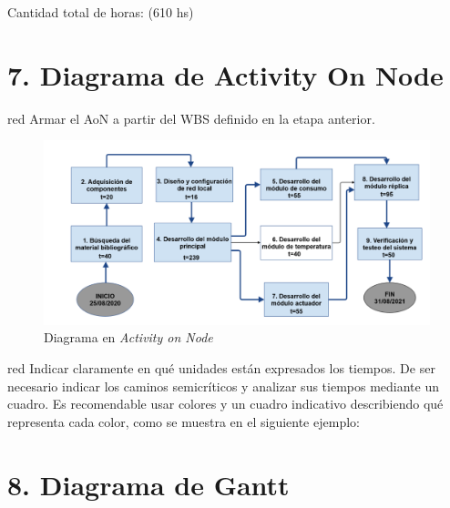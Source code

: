 \documentclass[11pt]{charter}
\begin{document}
Cantidad total de horas: (610 hs)

\section{7. Diagrama de Activity On Node}
\label{sec:AoN}

\begin{consigna}{red}
Armar el AoN a partir del WBS definido en la etapa anterior. 



\end{consigna}

\begin{figure}[htpb]
\centering 
\includegraphics[width=.8\textwidth]{./Figuras/AoN.png}
\caption{Diagrama en \textit{Activity on Node}}
\label{fig:AoN}
\end{figure}
\begin{consigna}{red}
Indicar claramente en qué unidades están expresados los tiempos.
De ser necesario indicar los caminos semicríticos y analizar sus tiempos mediante un cuadro.
Es recomendable usar colores y un cuadro indicativo describiendo qué representa cada color, como se muestra en el siguiente ejemplo:
\end{consigna}


\section{8. Diagrama de Gantt}
\label{sec:gantt}
\end{document}
